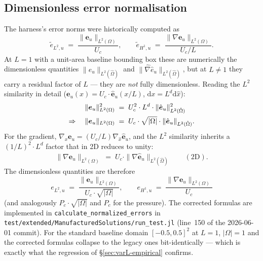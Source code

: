 \documentclass[11pt]{article}
\newcommand{\code}[1]{\texttt{#1}}
\begin{document}
\subsection{Dimensionless error normalisation}
\label{sec:varL-norm}

The harness's error norms were historically computed as
\begin{equation}
  \widetilde{e}_{L^2, u} \;=\; \frac{\|\boldsymbol{e}_u\|_{L^2(\Omega)}}{U_c},
  \qquad
  \widetilde{e}_{H^1, u} \;=\; \frac{\|\nabla \boldsymbol{e}_u\|_{L^2(\Omega)}}{U_c / L}.
\end{equation}
At $L = 1$ with a unit-area baseline bounding box these are numerically
the dimensionless quantities $\|\hat{e}_u\|_{L^2(\hat\Omega)}$ and
$\|\widehat{\nabla} \hat{e}_u\|_{L^2(\hat\Omega)}$, but at $L \neq 1$
they carry a residual factor of $L$ — they are \emph{not} fully
dimensionless. Reading the $L^2$ similarity in detail
($\boldsymbol{e}_u(x) = U_c \cdot \hat{\boldsymbol{e}}_u(x/L)$,
$\mathrm{d}x = L^d \mathrm{d}\hat{x}$):
\begin{align}
  \|\boldsymbol{e}_u\|_{L^2(\Omega)}^2
  \;&=\; U_c^2 \cdot L^d \cdot \|\hat{\boldsymbol{e}}_u\|_{L^2(\hat\Omega)}^2 \notag \\
  \Rightarrow \quad
  \|\boldsymbol{e}_u\|_{L^2(\Omega)}
  \;&=\; U_c \cdot \sqrt{|\Omega|} \cdot \|\hat{\boldsymbol{e}}_u\|_{L^2(\hat\Omega)}.
  \label{eq:l2-similarity}
\end{align}
For the gradient, $\nabla_x \boldsymbol{e}_u = (U_c / L) \nabla_{\hat{x}} \hat{\boldsymbol{e}}_u$,
and the $L^2$ similarity inherits a $(1/L)^2 \cdot L^d$ factor that in
2D reduces to unity:
\begin{equation}
  \|\nabla \boldsymbol{e}_u\|_{L^2(\Omega)}
  \;=\; U_c \cdot \|\widehat{\nabla} \hat{\boldsymbol{e}}_u\|_{L^2(\hat\Omega)}
  \qquad (\text{2D}).
  \label{eq:h1-similarity}
\end{equation}
The dimensionless quantities are therefore
\begin{equation}
  \boxed{\quad
    e_{L^2, u} \;=\; \frac{\|\boldsymbol{e}_u\|_{L^2(\Omega)}}{U_c \cdot \sqrt{|\Omega|}},
    \qquad
    e_{H^1, u} \;=\; \frac{\|\nabla \boldsymbol{e}_u\|_{L^2(\Omega)}}{U_c}
    \quad
  }
  \label{eq:norm-fix}
\end{equation}
(and analogously $P_c \cdot \sqrt{|\Omega|}$ and $P_c$ for the pressure).
The corrected formulas are implemented in
\code{calculate\_normalized\_errors} in
\code{test/extended/ManufacturedSolutions/run\_test.jl}
(line~150 of the 2026-06-01 commit). For
the standard baseline domain $[-0.5, 0.5]^2$ at $L = 1$, $|\Omega| = 1$
and the corrected formulas collapse to the legacy ones bit-identically —
which is exactly what the regression of §\ref{sec:varL-empirical}
confirms.
\end{document}
